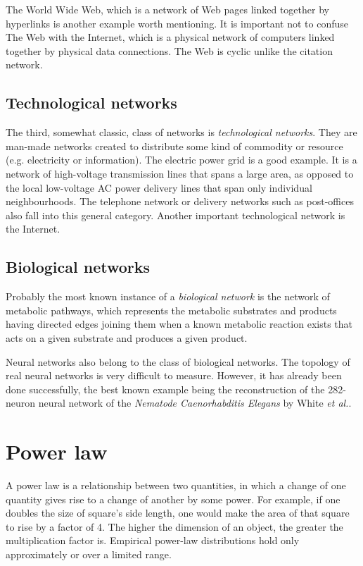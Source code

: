       The World Wide Web, which is a network of Web pages linked together by hyperlinks is another example worth mentioning. It is important not to confuse The Web with the Internet, which is a physical network of computers linked together by physical data connections. The Web is cyclic unlike the citation network.
        
    \subsection{Technological networks}

      The third, somewhat classic, class of networks is \emph{technological networks}. They are man-made networks created to distribute some kind of commodity or resource (e.g. electricity or information). The electric power grid is a good example. It is a network of high-voltage transmission lines that spans a large area, as opposed to the local low-voltage AC power delivery lines that span only individual neighbourhoods. The telephone network or delivery networks such as post-offices also fall into this general category. Another important technological network is the Internet.

    \subsection{Biological networks}

      Probably the most known instance of a \emph{biological network} is the network of metabolic pathways, which represents the metabolic substrates and products having directed edges joining them when a known metabolic reaction exists that acts on a given substrate and produces a given product.

      Neural networks also belong to the class of biological networks. The topology of real neural networks is very difficult to measure. However, it has already been done successfully, the best known example being the reconstruction of the 282-neuron neural network of the \textit{Nematode Caenorhabditis Elegans} by White \emph{et al.}\cite{White1986}.

  \section{Power law}
  
    A power law is a relationship between two quantities, in which a change of one quantity gives rise to a change of another by some power. For example, if one doubles the size of square's side length, one would make the area of that square to rise by a factor of 4. The higher the dimension of an object, the greater the multiplication factor is. Empirical power-law distributions hold only approximately or over a limited range.
    
